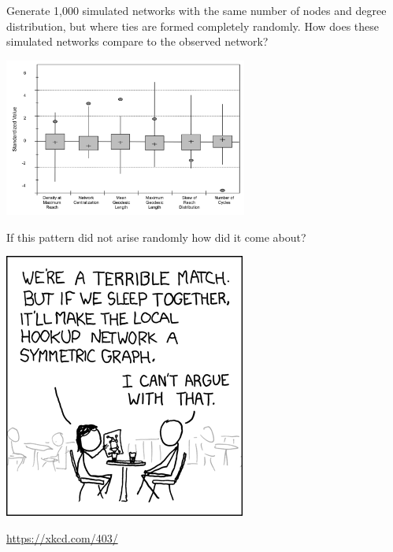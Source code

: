 \documentclass[aspectratio=169]{beamer}
\begin{document}
\begin{frame}

Generate 1,000 simulated networks with the same number of nodes and degree distribution, but where ties are formed completely randomly. How does these simulated networks compare to the observed network?
\pause
\begin{center}
\includegraphics[width = 0.6\textwidth]{figures/bearman_chains_2004_fig6}
\end{center}


\end{frame}
\begin{frame}

If this pattern did not arise randomly how did it come about?

\end{frame}
\begin{frame}

\begin{center}
\includegraphics[height = 0.8\textheight]{figures/xkcd_convincing_pickup_line}
\end{center}

\vfill
\url{https://xkcd.com/403/}


\end{frame}
\end{document}

